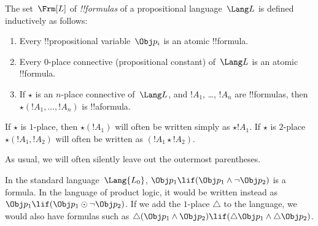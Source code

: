 \documentclass[../../../include/open-logic-section]{subfiles}
\begin{document}

\begin{defn}[Formula]
The set~$\Frm[L]$ of \emph{!!{formula}s} of a propositional
language~$\Lang L$ is defined inductively as follows:
\begin{enumerate}
\item Every !!{propositional variable}~$\Obj p_i$ is an atomic
  !!{formula}.
\item Every $0$-place connective (propositional constant) of~$\Lang L$
is an atomic !!{formula}.
\item If $\star$ is an $n$-place connective of~$\Lang L$, and $!A_1$,
\dots, $!A_n$ are !!{formula}s, then $\star(!A_1, \dots, !A_n)$ is
  !!a{formula}.
\end{enumerate}
If $\star$ is $1$-place, then $\star(!A_1)$ will often be written
simply as $\star !A_1$. If $\star$ is $2$-place $\star(!A_1,!A_2)$
will often be written as $(!A_1 \star !A_2)$. 
\end{defn}

As usual, we will often silently leave out the outermost parentheses.

\begin{ex}
  In the standard language~$\Lang{L_0}$, $\Obj p_1 \lif (\Obj p_1
  \land \lnot \Obj p_2)$ is a formula. In the language of product
  logic, it would be written instead as $\Obj p_1 \lif (\Obj p_1 \odot
  \lnot \Obj p_2)$.  If we add the $1$-place $\triangle$ to the
  language, we would also have formulas such as $\triangle (\Obj p_1
  \land \Obj p_2) \lif (\triangle \Obj p_1 \land \triangle \Obj p_2)$.
\end{ex}
\end{document}
